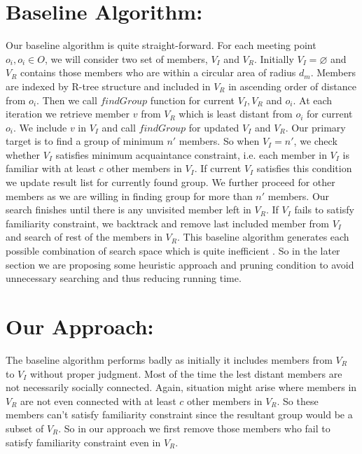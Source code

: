 \documentclass{vldb}
\begin{document}
			
			
			
			
			
		
		
		\section{Baseline Algorithm:}
		Our baseline algorithm is quite straight-forward. For each meeting point $ o_i, o_i \in O $, we will consider two set of members, $ V_I $ and $ V_R $. Initially $ V_I=\varnothing $ and $ V_R $ contains those members who are within a circular area of radius $ d_m $. Members are indexed by R-tree structure and included in $ V_R $ in ascending order of distance from $ o_i $. 
		Then we call $ findGroup $ function for current $ V_I, V_R $ and $ o_i $. At each iteration we retrieve member $ v $ from $ V_R $ which is least distant from $ o_i $ for current $ o_i $. We include $ v $ in $ V_I $ and call $ findGroup $ for updated $ V_I$ and $ V_R $. Our primary target is to find a group of minimum $ n' $ members. So when  $ V_I=n' $, we check whether $ V_I $ satisfies minimum acquaintance constraint, i.e. each member in $ V_I $ is familiar with at least $ c $ other members in $ V_I $. If current $ V_I $ satisfies this condition we update result list for currently found group. We further proceed for other members as we are willing in finding group for more than $ n' $ members. Our search finishes until there is any unvisited member left in $ V_R $. If $ V_I $ fails to satisfy familiarity constraint, we backtrack and remove last included member from $ V_I $ and search of rest of the members in $ V_R $. This baseline algorithm generates each possible combination of search space which is quite inefficient . So in the later section we are proposing some heuristic approach and pruning condition to avoid unnecessary searching and thus reducing running time. 
		
		\section{Our Approach:}
		The baseline algorithm performs badly as initially it includes members from $ V_R $ to $ V_I $ without proper judgment. Most of the time the lest distant members are not necessarily socially connected. Again, situation might arise where members in $ V_R $ are not even connected with at least $ c $ other members in $ V_R $. So these members can't satisfy familiarity constraint since the resultant group would be a subset of $ V_R $. So in our approach we first remove those members who fail to satisfy familiarity constraint even in $ V_R $. 
		
\end{document}
